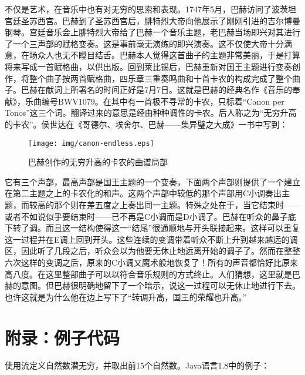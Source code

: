 \documentclass{article}
\begin{document}
不仅是艺术，在音乐中也有对无穷的思索和表现。1747年5月，巴赫访问了波茨坦宫廷圣苏西宫。巴赫到了圣苏西宫后，腓特烈大帝向他展示了刚刚引进的吉尔博曼钢琴。宫廷音乐会上腓特烈大帝给了巴赫一个音乐主题，老巴赫当场即兴对其进行了一个三声部的赋格变奏。这是事前毫无演练的即兴演奏。这不仅使大帝十分满意，在场众人也无不瞠目结舌。巴赫本人觉得这首曲子的主题非常美丽，于是打算将来写成一首赋格曲，以供出版。回到莱比锡后，巴赫重新对国王主题进行变奏创作，将整个曲子按两首赋格曲，四乐章三重奏鸣曲和十首卡农的构成完成了整个曲子。巴赫在献词上所署名的时间正好是7月7日。这就是巴赫的经典名作《音乐的奉献》，乐曲编号BWV1079。在其中有一首极不寻常的卡农，只标着“Canon per Tonos”这三个词。翻译过来的意思是经由种种调性的卡农。后人称之为“无穷升高的卡农”。侯世达在《哥德尔、埃舍尔、巴赫——集异璧之大成》一书中写到：

\begin{figure}[htbp]
 \centering
 \texttt{[image: img/canon-endless.eps]}
 \captionsetup{labelformat=empty}
 \caption{巴赫创作的无穷升高的卡农的曲谱局部}
 \label{fig:canon-endless}
\end{figure}

它有三个声部，最高声部是国王主题的一个变奏，下面两个声部则提供了一个建立在第二主题之上的卡农化的和声。这两个声部中较低的那个声部用C小调奏出主题，而较高的那个则在差五度之上奏出同一主题。特殊之处在于，当它结束时——或者不如说似乎要结束时——已不再是C小调而是D小调了。巴赫在听众的鼻子底下转了调。而且这一结构使得这一“结尾”很通顺地与开头联接起来。这样可以重复这一过程并在E调上回到开头。这些连续的变调带着听众不断上升到越来越远的调区，因此听了几段之后，听众会以为他要无休止地远离开始的调子了。然而在整整六次这样的变调之后，原来的C小调又魔术般地恢复了！所有的声音都恰好比原来高八度。在这里整部曲子可以以符合音乐规则的方式终止。人们猜想，这里就是巴赫的意图。但巴赫很明确地留下了一个暗示，说这一过程可以无休止地进行下去。也许这就是为什么他在边上写下了“转调升高，国王的荣耀也升高。”\cite{GEB}

\begin{Exercise}
\end{Exercise}

\section{附录：例子代码}

使用流定义自然数潜无穷，并取出前15个自然数。Java语言1.8中的例子：
\end{document}
